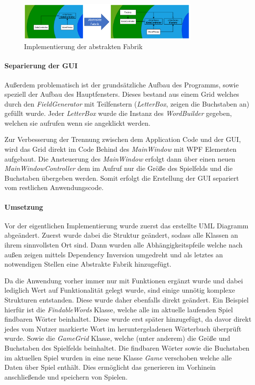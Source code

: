 \begin{figure}[!ht]
  \centering
  \includegraphics[width=0.8\textwidth]{Bilder/AbstrakteFabrik.PNG}
  \caption{Implementierung der abstrakten Fabrik}
  \label{Abb:AbstrakteFabrik}
\end{figure}

\paragraph{Separierung der GUI}
Außerdem problematisch ist der grundsätzliche Aufbau des Programms, sowie speziell der Aufbau des Hauptfensters. Dieses bestand aus einem Grid welches durch den \textit{FieldGenerator} mit Teilfenstern (\textit{LetterBox}, zeigen die Buchstaben an) gefüllt wurde. Jeder \textit{LetterBox} wurde die Instanz des \textit{WordBuilder} gegeben, welchen sie aufrufen wenn sie angeklickt werden.


Zur Verbesserung der Trennung zwischen dem Application Code und der GUI, wird das Grid direkt im Code Behind des \textit{MainWindow} mit WPF  Elementen aufgebaut. Die Ansteuerung des \textit{MainWindow} erfolgt dann über einen neuen \textit{MainWindowController} dem im Aufruf nur die Größe des Spielfelds und die Buchstaben übergeben werden. Somit erfolgt die Erstellung der GUI separiert vom restlichen Anwendungscode.

\paragraph{Umsetzung}
Vor der eigentlichen Implementierung wurde zuerst das erstellte UML Diagramm abgeändert. Zuerst wurde dabei die Struktur geändert, sodass alle Klassen an ihrem sinnvollsten Ort sind. Dann wurden alle Abhängigkeitspfeile welche nach außen zeigen mittels Dependency Inversion umgedreht und als letztes an notwendigen Stellen eine Abstrakte Fabrik hinzugefügt. 

Da die Anwendung vorher immer nur mit Funktionen ergänzt wurde und dabei lediglich Wert auf Funktionalität gelegt wurde, sind einige unnötig komplexe Strukturen entstanden. Diese wurde daher ebenfalls direkt geändert.
Ein Beispiel hierfür ist die \textit{FindableWords} Klasse, welche alle im aktuelle laufenden Spiel findbaren Wörter beinhaltet. Diese wurde erst später hinzugefügt, da davor direkt jedes vom Nutzer markierte Wort im heruntergeladenen Wörterbuch überprüft wurde. Sowie die \textit{GameGrid} Klasse, welche (unter anderem) die Größe und Buchstaben des Spielfelds beinhaltet. Die findbaren Wörter sowie die Buchstaben im aktuellen Spiel wurden in eine neue Klasse \textit{Game} verschoben welche alle Daten über Spiel enthält. Dies ermöglicht das generieren im Vorhinein anschließende und speichern von Spielen.

